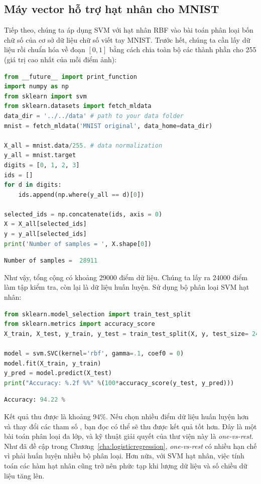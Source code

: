 \subsection{Máy vector hỗ trợ hạt nhân cho MNIST}
Tiếp theo, chúng ta áp dụng SVM với hạt nhân RBF vào bài toán phân loại bốn chữ số  của cơ sở dữ liệu chữ số viết tay MNIST.
Trước hết, chúng ta cần lấy dữ liệu rồi chuẩn hóa về đoạn $[0, 1]$ bằng cách chia toàn bộ các thành phần cho 255 (giá trị cao
nhất của mỗi điểm ảnh):
\begin{lstlisting}[language=Python]
from __future__ import print_function
import numpy as np
from sklearn import svm
from sklearn.datasets import fetch_mldata
data_dir = '../../data' # path to your data folder
mnist = fetch_mldata('MNIST original', data_home=data_dir)

X_all = mnist.data/255. # data normalization
y_all = mnist.target
digits = [0, 1, 2, 3]
ids = []
for d in digits:
    ids.append(np.where(y_all == d)[0])

selected_ids = np.concatenate(ids, axis = 0)
X = X_all[selected_ids]
y = y_all[selected_ids]
print('Number of samples = ', X.shape[0])
\end{lstlisting}
\kq
\begin{lstlisting}[language=Python]
Number of samples =  28911
\end{lstlisting}
Như vậy, tổng cộng có khoảng 29000 điểm dữ liệu. Chúng ta lấy ra 24000
điểm làm tập kiểm tra, còn lại là dữ liệu huấn luyện. Sử dụng bộ phân loại SVM hạt nhân:
\begin{lstlisting}[language=Python]
from sklearn.model_selection import train_test_split
from sklearn.metrics import accuracy_score
X_train, X_test, y_train, y_test = train_test_split(X, y, test_size= 24000)

model = svm.SVC(kernel='rbf', gamma=.1, coef0 = 0)
model.fit(X_train, y_train)
y_pred = model.predict(X_test)
print("Accuracy: %.2f %%" %(100*accuracy_score(y_test, y_pred)))
\end{lstlisting}
\kq
\begin{lstlisting}[language=Python]
Accuracy: 94.22 %
\end{lstlisting}
Kết quả thu được là khoảng 94\%. Nếu chọn nhiều điểm dữ liệu huấn luyện hơn và
thay đổi các tham số , bạn đọc có thể sẽ thu được
kết quả tốt hơn. Đây là một bài toán phân loại đa lớp, và
kỹ thuật giải quyết của thư viện này là \textit{one-vs-rest}. Như đã đề cập trong
Chương~\ref{cha:logisticregression}, \textit{one-vs-rest} có nhiều hạn chế vì
phải huấn luyện nhiều bộ phân loại. Hơn nữa, với SVM hạt nhân, việc tính toán các
hàm hạt nhân cũng trở nên phức tạp khi lượng dữ liệu và số chiều dữ liệu tăng lên.


